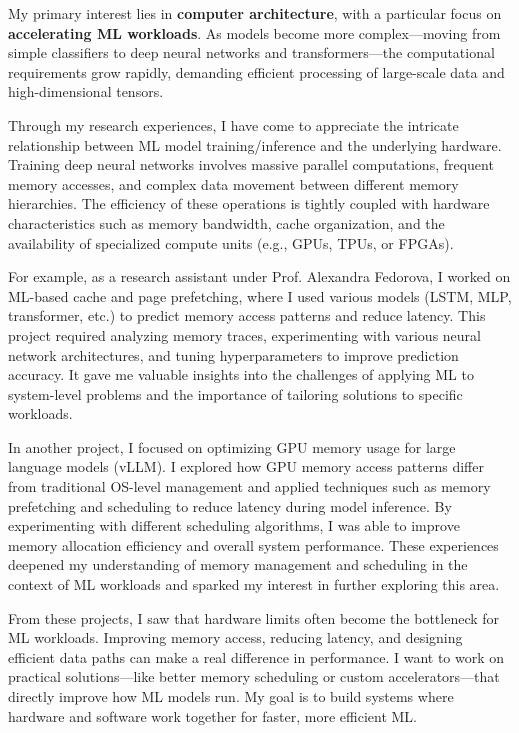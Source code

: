 \documentclass[a4 paper, 10pt]{article}
\begin{document}
My primary interest lies in \textbf{computer architecture}, with a particular focus on \textbf{accelerating ML workloads}. As models become more complex—moving from simple classifiers to deep neural networks and transformers—the computational requirements grow rapidly, demanding efficient processing of large-scale data and high-dimensional tensors.

Through my research experiences, I have come to appreciate the intricate relationship between ML model training/inference and the underlying hardware. Training deep neural networks involves massive parallel computations, frequent memory accesses, and complex data movement between different memory hierarchies. The efficiency of these operations is tightly coupled with hardware characteristics such as memory bandwidth, cache organization, and the availability of specialized compute units (e.g., GPUs, TPUs, or FPGAs).

For example, as a research assistant under Prof. Alexandra Fedorova, I worked on ML-based cache and page prefetching, where I used various models (LSTM, MLP, transformer, etc.) to predict memory access patterns and reduce latency. This project required analyzing memory traces, experimenting with various neural network architectures, and tuning hyperparameters to improve prediction accuracy. It gave me valuable insights into the challenges of applying ML to system-level problems and the importance of tailoring solutions to specific workloads.

In another project, I focused on optimizing GPU memory usage for large language models (vLLM). I explored how GPU memory access patterns differ from traditional OS-level management and applied techniques such as memory prefetching and scheduling to reduce latency during model inference. By experimenting with different scheduling algorithms, I was able to improve memory allocation efficiency and overall system performance. These experiences deepened my understanding of memory management and scheduling in the context of ML workloads and sparked my interest in further exploring this area.

From these projects, I saw that hardware limits often become the bottleneck for ML workloads. Improving memory access, reducing latency, and designing efficient data paths can make a real difference in performance. I want to work on practical solutions—like better memory scheduling or custom accelerators—that directly improve how ML models run. My goal is to build systems where hardware and software work together for faster, more efficient ML.
\end{document}
